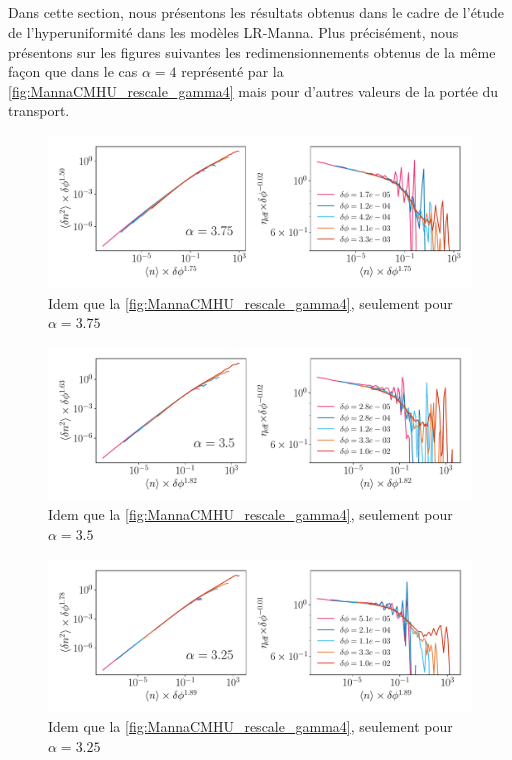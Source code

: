 \label{sec:mesures_HU_Manna}

\subparagraph{}Dans cette section, nous présentons les résultats obtenus dans le cadre de l'étude de l'hyperuniformité dans les modèles LR-Manna. Plus précisément, nous présentons sur les figures suivantes les redimensionnements obtenus de la même façon que dans le cas $\alpha=4$ représenté par la \autoref{fig:MannaCMHU_rescale_gamma4} mais pour d'autres valeurs de la portée du transport.

\begin{figure}[H]
	\centering
	\includegraphics[width=\textwidth]{Chapitre2/Figures/Hyperuniformity/RescaleHU_MannaCM_Gamma375.pdf}
	\caption{Idem que la \autoref{fig:MannaCMHU_rescale_gamma4}, seulement pour $\alpha=3.75$}
	\label{fig:MannaCMHU_rescale_gamma375}
\end{figure}

\begin{figure}[H]
	\centering
	\includegraphics[width=\textwidth]{Chapitre2/Figures/Hyperuniformity/RescaleHU_MannaCM_Gamma35.pdf}
	\caption{Idem que la \autoref{fig:MannaCMHU_rescale_gamma4}, seulement pour $\alpha=3.5$}
	\label{fig:MannaCMHU_rescale_gamma35}
\end{figure}

\begin{figure}[H]
	\centering
	\includegraphics[width=\textwidth]{Chapitre2/Figures/Hyperuniformity/RescaleHU_MannaCM_Gamma325.pdf}
	\caption{Idem que la \autoref{fig:MannaCMHU_rescale_gamma4}, seulement pour $\alpha=3.25$}
	\label{fig:MannaCMHU_rescale_gamma325}
\end{figure}

